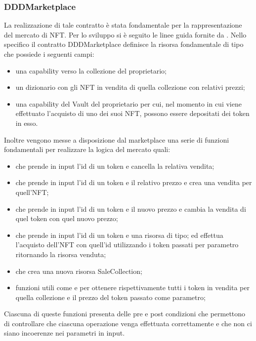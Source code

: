 \subsubsection{DDDMarketplace}
La realizzazione di tale contratto è  stata fondamentale per la rappresentazione del mercato di NFT. Per lo sviluppo si è seguito le linee guida fornite da \cite{web:marketplace}. Nello specifico il contratto DDDMarketplace definisce la risorsa fondamentale di tipo  che possiede i seguenti campi:
\begin{itemize}
    \item una capability verso la collezione del proprietario;
    \item un dizionario con gli NFT in vendita di quella collezione con relativi prezzi;
    \item una capability del Vault del proprietario per cui, nel momento in cui viene effettuato l'acquisto di uno dei suoi NFT, possono essere depositati dei token in esso.
\end{itemize}
Inoltre vengono messe a disposizione dal marketplace una serie di funzioni fondamentali per realizzare la logica del mercato quali:
\begin{itemize}
    \item {} che prende in input l'id di un token e cancella la relativa vendita;
    \item {} che prende in input l'id di un token e il relativo prezzo e crea una vendita per quell'NFT;
    \item {} che prende in input l'id di un token e il nuovo prezzo e cambia la vendita di quel token con quel nuovo prezzo;
    \item {} che prende in input l'id di un token e una risorsa di tipo; ed effettua l'acquisto dell'NFT con quell'id utilizzando i token passati per parametro ritornando la risorsa venduta;
    \item {} che crea una nuova risorsa SaleCollection;
    \item funzioni utili come  e  per ottenere rispettivamente tutti i token in vendita per quella collezione e il prezzo del token passato come parametro;
\end{itemize}
Ciascuna di queste funzioni presenta delle pre e post condizioni che permettono di controllare che ciascuna operazione venga effettuata correttamente e che non ci siano incoerenze nei parametri in input.

